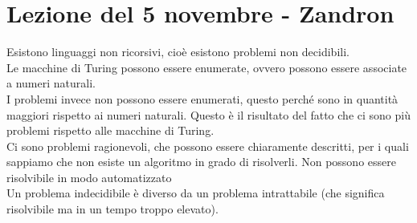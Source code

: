 \section{Lezione del 5 novembre - Zandron}
Esistono linguaggi non ricorsivi, cioè esistono problemi non decidibili.\\
Le macchine di Turing possono essere enumerate, ovvero possono essere associate a numeri naturali. \\
I problemi invece non possono essere enumerati, questo perché sono in quantità maggiori rispetto ai numeri naturali. Questo è il risultato del fatto che ci sono più problemi rispetto alle macchine di Turing.\\
Ci sono problemi ragionevoli, che possono essere chiaramente descritti, per i quali sappiamo che non esiste un algoritmo in grado di risolverli. Non possono essere risolvibile in modo automatizzato \\
Un problema indecidibile è diverso da un problema intrattabile (che significa risolvibile ma in un tempo troppo elevato).

